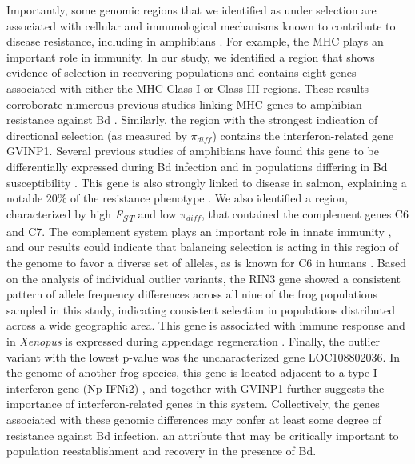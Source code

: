 \documentclass[9pt,twocolumn,twoside,lineno]{pnas-new}
\begin{document}
Importantly, some genomic regions that we identified as under selection
are associated with cellular and immunological mechanisms known to
contribute to disease resistance, including in amphibians
\citep{zamudio2020}. For example, the MHC plays an important role in
immunity. In our study, we identified a region that shows evidence of
selection in recovering populations and contains eight genes associated
with either the MHC Class I or Class III regions. These results
corroborate numerous previous studies linking MHC genes to amphibian
resistance against Bd \citep[e.g.,][]{savage2011, bataille2015}.
Similarly, the region with the strongest indication of directional
selection (as measured by \(\pi_{diff}\)) contains the
interferon-related gene GVINP1. Several previous studies of amphibians
have found this gene to be differentially expressed during Bd infection
\citep[e.g.,][]{grogan2018b, ellison2014} and in populations differing
in Bd susceptibility \citep{grogan2018b}. This gene is also strongly
linked to disease in salmon, explaining a notable 20\% of the resistance
phenotype \citep{robledo2020, robledo2018}. We also identified a region,
characterized by high \emph{F\textsubscript{ST}} and low \(\pi_{diff}\),
that contained the complement genes C6 and C7. The complement system
plays an important role in innate immunity \citep{rieraromo2016}, and
our results could indicate that balancing selection is acting in this
region of the genome to favor a diverse set of alleles, as is known for
C6 in humans \citep{soejima2005}. Based on the analysis of individual
outlier variants, the RIN3 gene showed a consistent pattern of allele
frequency differences across all nine of the frog populations sampled in
this study, indicating consistent selection in populations distributed
across a wide geographic area. This gene is associated with immune
response and in \emph{Xenopus} is expressed during appendage
regeneration \citep{fukazawa2009}. Finally, the outlier variant with the
lowest p-value was the uncharacterized gene LOC108802036. In the genome
of another frog species, this gene is located adjacent to a type I
interferon gene (Np-IFNi2) \citep{gan2018}, and together with GVINP1
further suggests the importance of interferon-related genes in this
system. Collectively, the genes associated with these genomic
differences may confer at least some degree of resistance against Bd
infection, an attribute that may be critically important to population
reestablishment and recovery in the presence of Bd.
\end{document}
